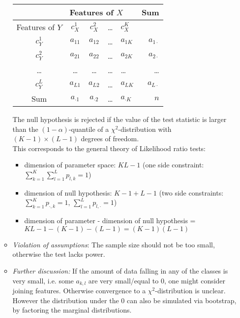 \documentclass[12pt,a4paper]{amsart}
\theoremstyle{definition}
\theoremstyle{remark}
\numberwithin{equation}{section}
\begin{document}
\begin{itemize}
\begin{itemize}
\begin{center}
\begin{tabular}{|c|c|c|c|l|r|}
\hline
& \multicolumn{4}{l|}{Features of $X$} & Sum \\
\hline
Features of $Y$ & $c_X^{1}$ & $c_X^2$ & \ldots & $c_X^K$ &  \\
\hline
$c_Y^1$ & $a_{11}$ & $a_{12}$ & \ldots & $a_{1K}$ & $a_{1 \cdot}$ \\
\hline
$c_Y^2$ & $a_{21}$ & $a_{22}$ & \ldots & $a_{2K}$ & $a_{2 \cdot}$ \\
\hline
\ldots & \ldots & \ldots & \ldots & \ldots & \ldots \\
\hline
$c_Y^L$ &  $a_{L1}$ & $a_{L2}$ & \ldots & $a_{LK}$ & $a_{L \cdot}$ \\
\hline
Sum & $a_{\cdot 1}$ & $a_{\cdot 2}$ & \ldots & $a_{\cdot K}$ & $n$\\
\hline
\end{tabular}
\end{center}

\medskip

 The null hypothesis is rejected if the value of the test statistic is larger than the $(1-\alpha)$-quantile of a $\chi^2$-distribution with $(K-1)\times (L-1)$ degrees of freedom.\\
This corresponds to the general theory of Likelihood ratio tests: 
\begin{itemize}
\item dimension of parameter space: $KL-1$ (one side constraint: $\sum_{k=1}^K \sum_{l=1}^L p_{l,k}=1$)
\item dimension of null hypothesis: $K-1+L-1$ (two side constraints: $\sum_{k=1}^K p_{\cdot,k}=1$, $\sum_{l=1}^L p_{l,\cdot}=1$)
\item dimension of parameter - dimension of null hypothesis = $KL-1-(K-1)-(L-1)=(K-1)(L-1)$
\end{itemize}
\item \textit{Violation of assumptions}: The sample size should not be too small, otherwise the test lacks power. 
\item \textit{Further discussion:} If the amount of data falling in any of the classes is very small, i.e. some $a_{k,l}$ are very small/equal to $0$, one might consider joining features. Otherwise convergence to a $\chi^2$-distribution is unclear. However the distribution under the $0$  can also be simulated via bootstrap, by factoring the marginal distributions.  \\
\end{itemize}



\end{itemize}
\end{document}
